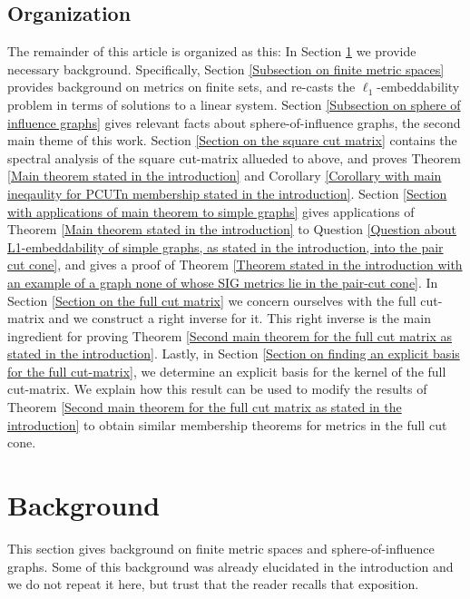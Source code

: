 \documentclass[12pt]{amsart}
\numberwithin{theorem}{section}
\theoremstyle{remark}
\begin{document}
\subsection{Organization} The remainder of this article is organized as this: In Section \ref{Section with background material} we provide necessary background. Specifically, Section \ref{Subsection on finite metric spaces} provides background on metrics on finite sets, and re-casts the $\ell_1$-embeddability problem in terms of solutions to a linear system. Section \ref{Subsection on sphere of influence graphs} gives relevant facts about sphere-of-influence graphs, the second main theme of this work. Section \ref{Section on the square cut matrix} contains the spectral analysis of the square cut-matrix allueded to above, and proves Theorem \ref{Main theorem stated in the introduction} and Corollary \ref{Corollary with main ineqaulity for PCUTn membership stated in the introduction}. Section \ref{Section with applications of main theorem to simple graphs} gives applications of Theorem \ref{Main theorem stated in the introduction} to Question \ref{Question about L1-embeddability of simple graphs, as stated in the introduction, into the pair cut cone}, and gives a proof of Theorem \ref{Theorem stated in the introduction with an example of a graph none of whose SIG metrics lie in the pair-cut cone}. In Section \ref{Section on the full cut matrix} we concern ourselves with the full cut-matrix and we construct a right inverse for it. This right inverse is the main ingredient for proving Theorem \ref{Second main theorem for the full cut matrix as stated in the introduction}. Lastly, in Section \ref{Section on finding an explicit basis for the full cut-matrix}, we determine an explicit basis for the kernel of the full cut-matrix. We explain how this result can be used to modify the results of Theorem \ref{Second main theorem for the full cut matrix as stated in the introduction} to obtain similar membership theorems for metrics in the full cut cone.  






\section{Background} \label{Section with background material}
This section gives background on finite metric spaces and sphere-of-influence graphs. Some of this background was already elucidated in the introduction and we do not repeat it here, but trust that the reader recalls that exposition. 
\end{document}
